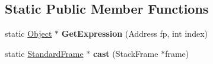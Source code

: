 \subsection*{Static Public Member Functions}
\begin{DoxyCompactItemize}
\item 
\hypertarget{classv8_1_1internal_1_1_standard_frame_ac5517a4204992a050d3473b34cc33d2d}{}static \hyperlink{classv8_1_1internal_1_1_object}{Object} $\ast$ {\bfseries Get\+Expression} (Address fp, int index)\label{classv8_1_1internal_1_1_standard_frame_ac5517a4204992a050d3473b34cc33d2d}

\item 
\hypertarget{classv8_1_1internal_1_1_standard_frame_ac92588167f70de41f1eaefb2f8addc14}{}static \hyperlink{classv8_1_1internal_1_1_standard_frame}{Standard\+Frame} $\ast$ {\bfseries cast} (Stack\+Frame $\ast$frame)\label{classv8_1_1internal_1_1_standard_frame_ac92588167f70de41f1eaefb2f8addc14}

\end{DoxyCompactItemize}
